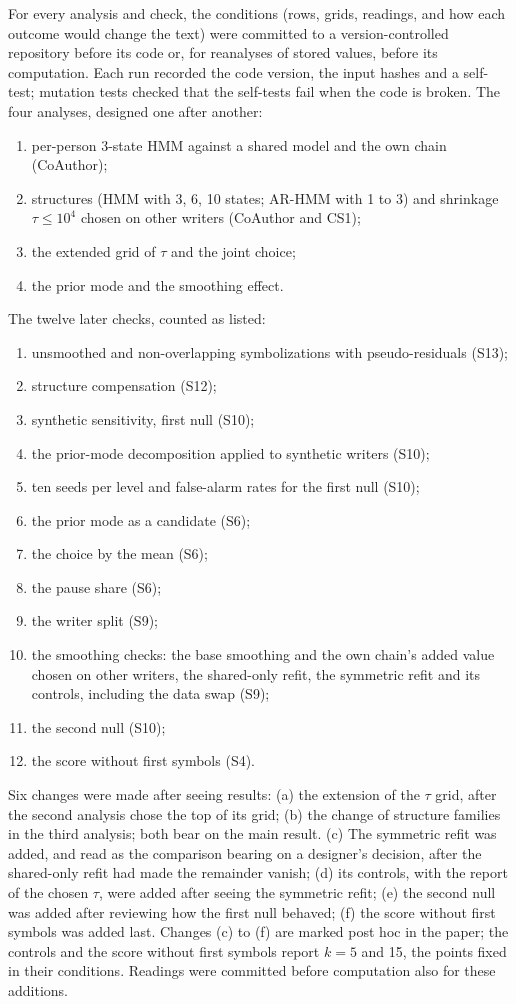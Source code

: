 \documentclass[10pt]{article}
\newcommand{\hmmthree}{\mbox{3-state} HMM}
\begin{document}
For every analysis and check, the conditions (rows, grids, readings, and how each outcome would change the text) were committed to a version-controlled repository before its code or, for reanalyses of stored values, before its computation. Each run recorded the code version, the input hashes and a self-test; mutation tests checked that the self-tests fail when the code is broken. The four analyses, designed one after another:
\begin{enumerate}
\item per-person \hmmthree{} against a shared model and the own chain (CoAuthor);
\item structures (HMM with 3, 6, 10 states; AR-HMM with 1 to 3) and shrinkage $\tau\le10^4$ chosen on other writers (CoAuthor and CS1);
\item the extended grid of $\tau$ and the joint choice;
\item the prior mode and the smoothing effect.
\end{enumerate}
The twelve later checks, counted as listed:
\begin{enumerate}
\item unsmoothed and non-overlapping symbolizations with pseudo-residuals (S13);
\item structure compensation (S12);
\item synthetic sensitivity, first null (S10);
\item the prior-mode decomposition applied to synthetic writers (S10);
\item ten seeds per level and false-alarm rates for the first null (S10);
\item the prior mode as a candidate (S6);
\item the choice by the mean (S6);
\item the pause share (S6);
\item the writer split (S9);
\item the smoothing checks: the base smoothing and the own chain's added value chosen on other writers, the shared-only refit, the symmetric refit and its controls, including the data swap (S9);
\item the second null (S10);
\item the score without first symbols (S4).
\end{enumerate}
Six changes were made after seeing results: (a) the extension of the $\tau$ grid, after the second analysis chose the top of its grid; (b) the change of structure families in the third analysis; both bear on the main result. (c) The symmetric refit was added, and read as the comparison bearing on a designer's decision, after the shared-only refit had made the remainder vanish; (d) its controls, with the report of the chosen $\tau$, were added after seeing the symmetric refit; (e) the second null was added after reviewing how the first null behaved; (f) the score without first symbols was added last. Changes (c) to (f) are marked post hoc in the paper; the controls and the score without first symbols report $k=5$ and 15, the points fixed in their conditions. Readings were committed before computation also for these additions.
\end{document}
